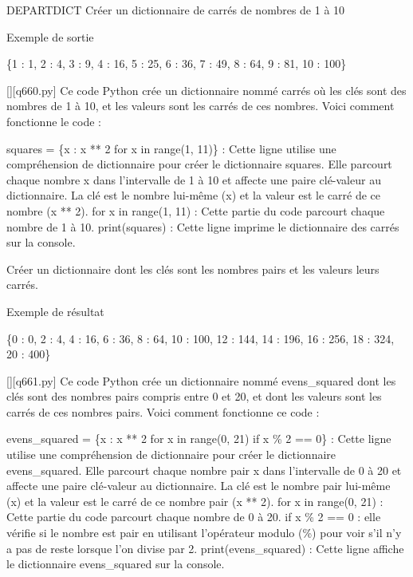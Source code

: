 \renewcommand{\chemincode}{../../code/}
        \question
        DEPARTDICT
Créer un dictionnaire de carrés de nombres de 1 à 10

Exemple de sortie

\{1 : 1, 2 : 4, 3 : 9, 4 : 16, 5 : 25, 6 : 36, 7 : 49, 8 : 64, 9 : 81, 10 : 100\}
        \par
        \begin{solution}
            \renewcommand{\nomfichier}{q660.py}
            \pythonfile{\chemincode \nomfichier}[][\nomfichier]
            Ce code Python crée un dictionnaire nommé carrés où les clés sont des nombres de 1 à 10, et les valeurs sont les carrés de ces nombres. Voici comment fonctionne le code :

    squares = \{x : x ** 2 for x in range(1, 11)\} : Cette ligne utilise une compréhension de dictionnaire pour créer le dictionnaire squares. Elle parcourt chaque nombre x dans l'intervalle de 1 à 10 et affecte une paire clé-valeur au dictionnaire. La clé est le nombre lui-même (x) et la valeur est le carré de ce nombre (x ** 2).
        for x in range(1, 11) : Cette partie du code parcourt chaque nombre de 1 à 10.
    print(squares) : Cette ligne imprime le dictionnaire des carrés sur la console.
        \end{solution}
        

        \question
        Créer un dictionnaire dont les clés sont les nombres pairs et les valeurs leurs carrés.

Exemple de résultat

\{0 : 0, 2 : 4, 4 : 16, 6 : 36, 8 : 64, 10 : 100, 12 : 144, 14 : 196, 16 : 256, 18 : 324, 20 : 400\}
        \par
        \begin{solution}
            \renewcommand{\nomfichier}{q661.py}
            \pythonfile{\chemincode \nomfichier}[][\nomfichier]
            Ce code Python crée un dictionnaire nommé evens\_squared dont les clés sont des nombres pairs compris entre 0 et 20, et dont les valeurs sont les carrés de ces nombres pairs. Voici comment fonctionne ce code :

    evens\_squared = \{x : x ** 2 for x in range(0, 21) if x \% 2 == 0\} : Cette ligne utilise une compréhension de dictionnaire pour créer le dictionnaire evens\_squared. Elle parcourt chaque nombre pair x dans l'intervalle de 0 à 20 et affecte une paire clé-valeur au dictionnaire. La clé est le nombre pair lui-même (x) et la valeur est le carré de ce nombre pair (x ** 2).
        for x in range(0, 21) : Cette partie du code parcourt chaque nombre de 0 à 20.
        if x \% 2 == 0 : elle vérifie si le nombre est pair en utilisant l'opérateur modulo (\%) pour voir s'il n'y a pas de reste lorsque l'on divise par 2.
    print(evens\_squared) : Cette ligne affiche le dictionnaire evens\_squared sur la console.
        \end{solution}
        


